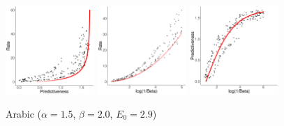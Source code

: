 \documentclass[11pt,letterpaper]{article}
\begin{document}
\begin{figure}
\begin{center}
	\includegraphics[width=0.3\textwidth]{code/figures/ru-words-info-fitted.pdf}
\includegraphics[width=0.3\textwidth]{code/figures/ru-words-nlogbeta-mem-fitted.pdf}
\includegraphics[width=0.3\textwidth]{code/figures/ru-words-nlogbeta-ee-fitted.pdf}

		Arabic {\tiny ($\alpha=1.5$, $\beta=2.0$, $E_0=2.9$)}


\end{center}
\end{figure}
\end{document}
